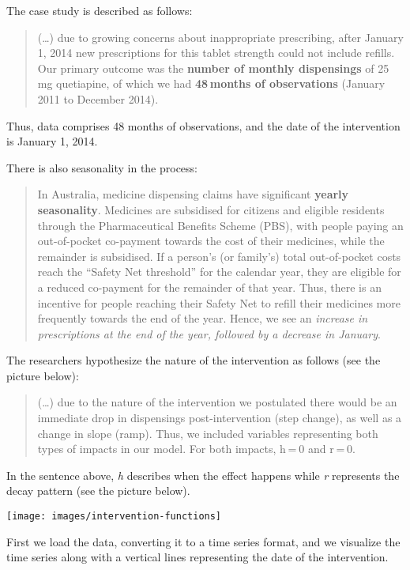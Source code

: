 \documentclass[
]{article}
\begin{document}
The case study is described as follows:

\begin{quote}
(\ldots) due to growing concerns about inappropriate prescribing, after January 1, 2014 new prescriptions for this tablet strength could not include refills. Our primary outcome was the \textbf{number of monthly dispensings} of 25 mg quetiapine, of which we had \textbf{48 months of observations} (January 2011 to December 2014).
\end{quote}

Thus, data comprises 48 months of observations, and the date of the intervention is January 1, 2014.

There is also seasonality in the process:

\begin{quote}
In Australia, medicine dispensing claims have significant \textbf{yearly seasonality}. Medicines are subsidised for citizens and eligible residents through the Pharmaceutical Benefits Scheme (PBS), with people paying an out-of-pocket co-payment towards the cost of their medicines, while the remainder is subsidised. If a person's (or family's) total out-of-pocket costs reach the ``Safety Net threshold'' for the calendar year, they are eligible for a reduced co-payment for the remainder of that year. Thus, there is an incentive for people reaching their Safety Net to refill their medicines more frequently towards the end of the year. Hence, we see an \emph{increase in prescriptions at the end of the year, followed by a decrease in January}.
\end{quote}

The researchers hypothesize the nature of the intervention as follows (see the picture below):

\begin{quote}
(\ldots) due to the nature of the intervention we postulated there would be an immediate drop in dispensings post-intervention (step change), as well as a change in slope (ramp). Thus, we included variables representing both types of impacts in our model. For both impacts, h = 0 and r = 0.
\end{quote}

In the sentence above, \emph{h} describes when the effect happens while \emph{r} represents the decay pattern (see the picture below).

\texttt{[image: images/intervention-functions]}

First we load the data, converting it to a time series format, and we visualize the time series along with a vertical lines representing the date of the intervention.
\end{document}
